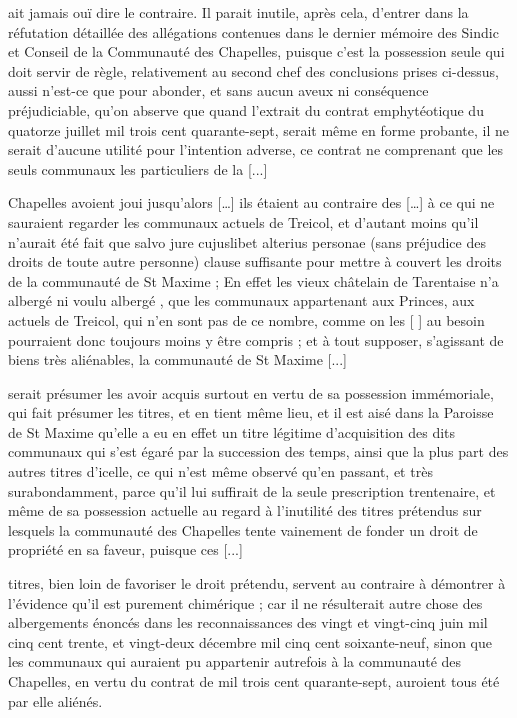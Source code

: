 \documentclass[a4paper,twoside,openany]{article}
\begin{document}

ait jamais ouï dire le contraire. Il parait inutile, après cela, d'entrer dans la réfutation détaillée des allégations contenues dans le dernier mémoire des Sindic et Conseil de la Communauté des Chapelles, puisque c'est la possession seule qui doit servir de règle, relativement au second chef des conclusions prises ci-dessus, aussi n'est-ce que pour abonder, et sans aucun aveux ni conséquence préjudiciable, qu’on abserve que quand l'extrait du contrat emphytéotique du quatorze juillet mil trois cent quarante-sept, serait même en forme probante, il ne serait d'aucune utilité pour l'intention adverse, ce contrat ne comprenant que les seuls communaux les particuliers de la [...]

 Chapelles avoient joui jusqu’alors […] ils étaient au contraire des […] à ce qui ne sauraient regarder les communaux actuels de Treicol, et d'autant moins qu'il n’aurait été fait que salvo jure cujuslibet alterius personae (sans préjudice des droits de toute autre personne) clause suffisante pour mettre à couvert les droits de la communauté de St Maxime ; En effet les vieux  châtelain de Tarentaise n'a albergé ni voulu albergé , que les communaux appartenant aux Princes, aux actuels de Treicol, qui n'en sont pas de ce nombre, comme on les [ ] au besoin  pourraient donc toujours moins y être compris ; et à tout supposer, s'agissant de biens très aliénables, la communauté de St Maxime [...]


serait présumer les avoir acquis surtout en vertu de sa possession immémoriale, qui fait présumer les titres, et en tient même lieu, et il est aisé dans la Paroisse de St Maxime qu'elle a eu en effet un titre légitime d'acquisition des dits communaux qui s'est égaré par la succession des temps, ainsi que la plus part des autres titres d'icelle, ce qui n'est même observé qu'en passant, et très surabondamment, parce qu'il lui suffirait de la seule prescription trentenaire, et même de sa possession actuelle au regard à l'inutilité des titres prétendus sur lesquels la communauté des Chapelles tente vainement de fonder un droit de propriété en sa faveur, puisque ces [...]

titres, bien loin de favoriser le droit prétendu, servent au contraire à démontrer à l'évidence qu'il est purement chimérique ; car il ne résulterait autre chose des albergements énoncés dans les reconnaissances des vingt et vingt-cinq juin mil cinq cent trente, et vingt-deux décembre mil cinq cent soixante-neuf, sinon que les communaux qui auraient pu appartenir autrefois à la communauté des Chapelles, en vertu du contrat de mil trois cent quarante-sept, auroient tous été par elle aliénés.
\end{document}
